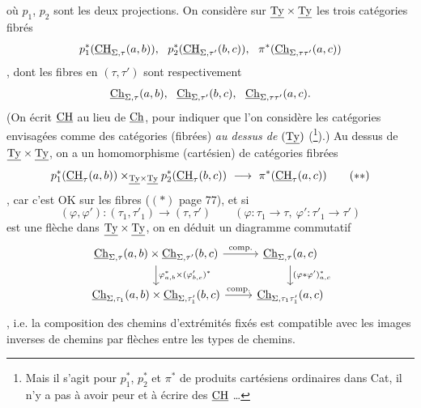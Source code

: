 où $p_1$, $p_2$ sont les deux projections. On considère sur $\underline{\mathrm{Ty}}\times\underline{\mathrm{Ty}}$ les trois catégories fibrés %
\[
p_1^*(\CH_{\Sigma,\tau}(a,b)),\ \ p_2^*(\CH_{\Sigma,\tau'}(b,c)),\ \ \pi^*(\Ch_{\Sigma,\tau\tau'}(a,c))
\]
, dont les fibres en $(\tau,\tau')$ sont respectivement %
\[
\Ch_{\Sigma,\tau}(a,b),\ \ \Ch_{\Sigma,\tau'}(b,c),\ \ \Ch_{\Sigma,\tau\tau'}(a,c).
\]
(On écrit $\underline{\mathrm{CH}}$ au lieu de $\underline{\mathrm{Ch}}$, pour indiquer que l'on considère les catégories envisagées comme des catégories (fibrées) \textit{au dessus de} $(\underline{\mathrm{Ty}})$ (\footnote{Mais il s'agit pour $p_1^*$, $p_2^*$ et $\pi^*$ de produits cartésiens ordinaires dans Cat, il n'y a pas à avoir peur et à écrire des $\underline{\mathrm{CH}}$ \ldots}).) Au dessus de $\underline{\mathrm{Ty}}\times\underline{\mathrm{Ty}}$, on a un homomorphisme (cartésien) de catégories fibrées
\[
p_1^*(\underline{\mathrm{CH}}_{\tau}(a,b))\times_{\underline{\mathrm{Ty}}\times\underline{\mathrm{Ty}}} p_2^*(\underline{\mathrm{CH}}_{\tau}(b,c)) \ \longrightarrow\ \pi^*(\underline{\mathrm{CH}}_{\tau}(a,c)) \tag*{$(**)$}
\]
,
car c'est OK sur les fibres ($(*)$ page 77), et si
\[
(\varphi,\varphi') : (\tau_1,\tau'_1) \longrightarrow (\tau,\tau') \qquad (\varphi : \tau_1 \longrightarrow \tau,\ \varphi' : \tau'_1 \longrightarrow \tau')
\]
est une flèche dans $\underline{\mathrm{Ty}}\times\underline{\mathrm{Ty}}$, on en déduit un diagramme commutatif
\[
\begin{tikzcd}
\Ch_{\Sigma,\tau}(a,b)\times\Ch_{\Sigma,\tau'}(b,c) \ar[r,"\text{comp.}"] \ar[d,"\varphi^*_{a,b}\times(\varphi'_{b,c})^*"] & \Ch_{\Sigma,\tau}(a,c) \ar[d,"(\varphi*\varphi')^*_{a,c}"] \\
\Ch_{\Sigma,\tau_1}(a,b)\times\Ch_{\Sigma,\tau'_1}(b,c) \ar[r,"\text{comp.}"] & \Ch_{\Sigma,\tau_1\tau'_1}(a,c)
\end{tikzcd}
\]
, i.e. la composition des chemins d'extrémités fixés est compatible avec les images inverses de chemins par flèches entre les types de chemins.

